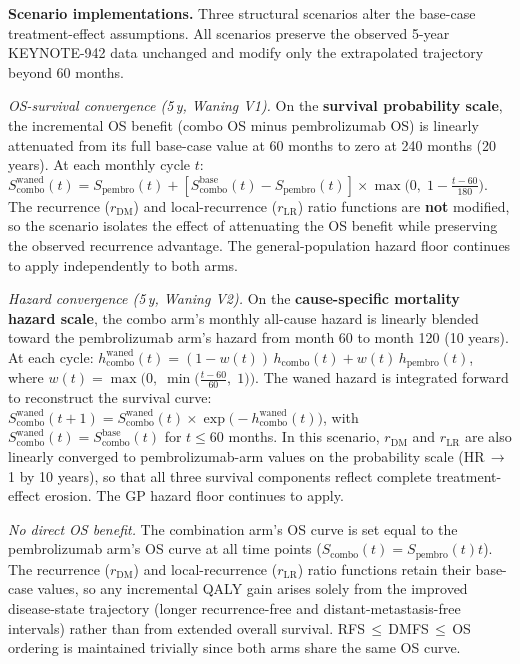 \documentclass[11pt,a4paper]{article}
\begin{document}
\noindent\textbf{Scenario implementations.} Three structural scenarios alter the base-case treatment-effect assumptions. All scenarios preserve the observed 5-year KEYNOTE-942 data unchanged and modify only the extrapolated trajectory beyond 60 months.

\textit{OS-survival convergence (5\,y, Waning V1).} On the \textbf{survival probability scale}, the incremental OS benefit (combo OS minus pembrolizumab OS) is linearly attenuated from its full base-case value at 60 months to zero at 240 months (20 years). At each monthly cycle $t$: $S_{\text{combo}}^{\text{waned}}(t) = S_{\text{pembro}}(t) + [S_{\text{combo}}^{\text{base}}(t) - S_{\text{pembro}}(t)] \times \max\bigl(0,\; 1 - \frac{t - 60}{180}\bigr)$. The recurrence ($r_{\text{DM}}$) and local-recurrence ($r_{\text{LR}}$) ratio functions are \textbf{not} modified, so the scenario isolates the effect of attenuating the OS benefit while preserving the observed recurrence advantage. The general-population hazard floor continues to apply independently to both arms.

\textit{Hazard convergence (5\,y, Waning V2).} On the \textbf{cause-specific mortality hazard scale}, the combo arm's monthly all-cause hazard is linearly blended toward the pembrolizumab arm's hazard from month 60 to month 120 (10 years). At each cycle: $h_{\text{combo}}^{\text{waned}}(t) = (1 - w(t))\,h_{\text{combo}}(t) + w(t)\,h_{\text{pembro}}(t)$, where $w(t) = \max\bigl(0,\; \min\bigl(\frac{t - 60}{60},\; 1\bigr)\bigr)$. The waned hazard is integrated forward to reconstruct the survival curve: $S_{\text{combo}}^{\text{waned}}(t+1) = S_{\text{combo}}^{\text{waned}}(t) \times \exp\bigl(-h_{\text{combo}}^{\text{waned}}(t)\bigr)$, with $S_{\text{combo}}^{\text{waned}}(t) = S_{\text{combo}}^{\text{base}}(t)$ for $t \leq 60$ months. In this scenario, $r_{\text{DM}}$ and $r_{\text{LR}}$ are also linearly converged to pembrolizumab-arm values on the probability scale (HR\,$\to$\,1 by 10 years), so that all three survival components reflect complete treatment-effect erosion. The GP hazard floor continues to apply.

\textit{No direct OS benefit.} The combination arm's OS curve is set equal to the pembrolizumab arm's OS curve at all time points ($S_{\text{combo}}(t) = S_{\text{pembro}}(t)$\;\forall\;$t$). The recurrence ($r_{\text{DM}}$) and local-recurrence ($r_{\text{LR}}$) ratio functions retain their base-case values, so any incremental QALY gain arises solely from the improved disease-state trajectory (longer recurrence-free and distant-metastasis-free intervals) rather than from extended overall survival. RFS\,$\leq$\,DMFS\,$\leq$\,OS ordering is maintained trivially since both arms share the same OS curve.
\end{document}
